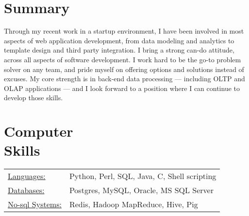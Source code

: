 \documentclass[margin]{res}
\begin{document}

\address{1404 Duckwall Road \\ Berkeley Springs, WV 25411  \\
(917) 678 3636 \\
\href{mailto:mark.tozzi@gmail.com}{mark.tozzi@gmail.com}
$\bullet$ \href{https://github.com/not-napoleon}{github: not-napoleon}
$\bullet$ \href{https://twitter.com/not_napoleon}{twitter: not\_napoleon} }


\begin{resume}

\section{Summary}
Through my recent work in a startup environment, I have been involved in most
aspects of web application development, from data modeling and analytics
to template design and third party integration. I bring a strong can-do
attitude, across all aspects of software development. I work hard to
be the go-to problem solver on any team, and pride myself on offering options
and solutions instead of excuses. My core strength is in back-end data
processing --- including OLTP and OLAP applications --- and I look forward to a
position where I can continue to develop those skills.

\section{Computer \\ Skills}
   \begin{tabular}{l p{3in}}
     \underline{Languages:} & Python, Perl, SQL, Java, C, Shell scripting\\
     \underline{Databases:} & Postgres, MySQL, Oracle, MS SQL Server \\
     \underline{No-sql Systems:} & Redis, Hadoop MapReduce, Hive, Pig
   \end{tabular}

\raggedright{}

\end{resume}
\end{document}
